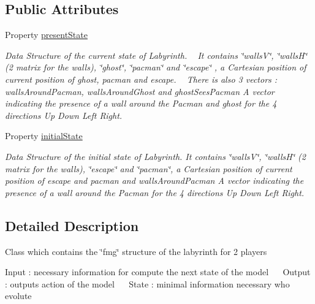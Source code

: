\subsection*{Public Attributes}
\begin{DoxyCompactItemize}
\item 
Property \hyperlink{class_model_laby_a9624cc7c421a50fa5086b0ebd0cd5fe3}{present\+State}
\begin{DoxyCompactList}\small\item\em Data Structure of the current state of Labyrinth. ~\newline
 It contains \char`\"{}walls\+V\char`\"{}, \char`\"{}walls\+H\char`\"{} (2 matrix for the walls), \char`\"{}ghost\char`\"{}, \char`\"{}pacman\char`\"{} and \char`\"{}escape\char`\"{} , a Cartesian position of current position of ghost, pacman and escape. ~\newline
 There is also 3 vectors \+: \textquotesingle{}walls\+Around\+Pacman\textquotesingle{}, \textquotesingle{}walls\+Around\+Ghost\textquotesingle{} and \textquotesingle{}ghost\+Sees\+Pacman\textquotesingle{} A vector indicating the presence of a wall around the Pacman and ghost for the 4 directions Up Down Left Right. \end{DoxyCompactList}\item 
Property \hyperlink{class_model_laby_acd9263acfa96c9138afdf497e55acc24}{initial\+State}
\begin{DoxyCompactList}\small\item\em Data Structure of the initial state of Labyrinth. It contains \char`\"{}walls\+V\char`\"{}, \char`\"{}walls\+H\char`\"{} (2 matrix for the walls), \char`\"{}escape\char`\"{} and \char`\"{}pacman\char`\"{}, a Cartesian position of current position of escape and pacman and \textquotesingle{}walls\+Around\+Pacman\textquotesingle{} A vector indicating the presence of a wall around the Pacman for the 4 directions Up Down Left Right. \end{DoxyCompactList}\end{DoxyCompactItemize}


\subsection{Detailed Description}
Class which contains the \char`\"{}fmg\char`\"{} structure of the labyrinth for 2 players 

Input \+: necessary information for compute the next state of the model~\newline
~\newline
 Output \+: output\textquotesingle{}s action of the model~\newline
 ~\newline
 State \+: minimal information necessary who evolute 

